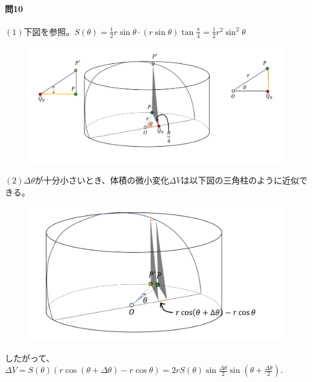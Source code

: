\documentclass[a4j,dvipdfmx]{jsarticle}
\begin{document}
                    \paragraph{問10}$(1)$下図を参照。$S(\theta)=\frac{1}{2}r\sin\theta\cdot(r\sin\theta)\tan\frac{\pi}{4}=\frac{1}{2}r^2\sin^2\theta$
                        \begin{figure}[h]
                            \centering
                            \includegraphics[scale=0.5]{img/QuuNote/Mondai3_10_1.png}
                        \end{figure}

                        $(2)\Delta \theta$が十分小さいとき、体積の微小変化$\Delta V$は以下図の三角柱のように近似できる。
                        \begin{figure}[h]
                            \centering
                            \includegraphics[scale=0.3]{img/QuuNote/Mondai3_10_2.png}
                        \end{figure}

                        \noindent したがって、$\Delta V=S(\theta)(r\cos(\theta+\Delta \theta)-r\cos\theta)=2rS(\theta)\sin\frac{\Delta \theta}{2}\sin\left(\theta+\frac{\Delta\theta}{2}\right).$\\
\end{document}
